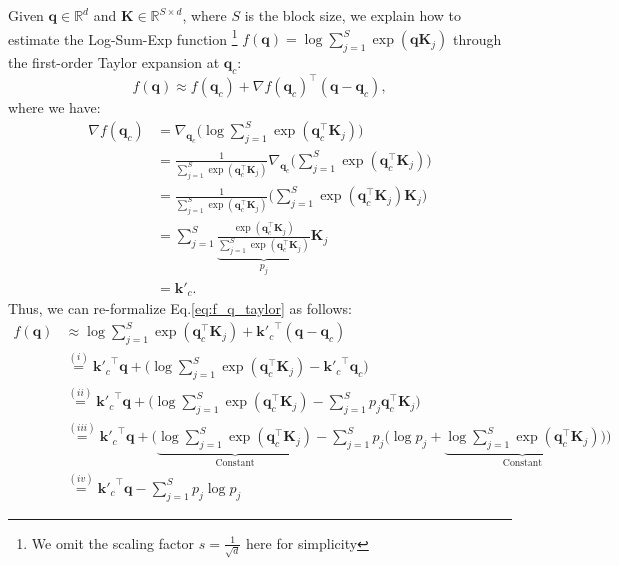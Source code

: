 Given $\boldsymbol{q} \in \mathbb{R}^{d}$ and $\mathbf{K} \in \mathbb{R}^{S\times d}$, where $S$ is the block size, we explain how to estimate the Log-Sum-Exp function \footnote{We omit the scaling factor $s=\frac{1}{\sqrt{d}}$ here for simplicity} $f(\boldsymbol{q}) = \log\sum_{j=1}^{S} \exp({\boldsymbol{q}\mathbf{K}_j})$ through the first-order Taylor expansion at $\boldsymbol{q}_c$:
\begin{equation}
f(\boldsymbol{q}) \approx f(\boldsymbol{q}_c) + \nabla f(\boldsymbol{q}_c)^{\top} (\boldsymbol{q} - \boldsymbol{q}_c),\label{eq:f_q_taylor}
\end{equation}
where we have:
\begin{align}
\nabla f(\boldsymbol{q}_c) &= \nabla_{\boldsymbol{q}_c} \Big(\log\sum_{j=1}^{S} \exp({\boldsymbol{q}_c^\top\mathbf{K}_j} )\Big) \\
&= \frac{1}{\sum_{j=1}^{S}\exp({\boldsymbol{q}_c^\top\mathbf{K}_j})}\nabla_{\boldsymbol{q}_c}\Big(\sum_{j=1}^{S} \exp({\boldsymbol{q}_c^\top\mathbf{K}_j} )\Big) \nonumber \\
&= \frac{1}{\sum_{j=1}^{S}\exp({\boldsymbol{q}_c^\top\mathbf{K}_j})}\Big(\sum_{j=1}^{S} \exp({\boldsymbol{q}_c^\top\mathbf{K}_j} )\mathbf{K}_j\Big) \nonumber\\
&= \sum_{j=1}^{S} \underbrace{\frac{\exp({\boldsymbol{q}_c^\top\mathbf{K}_j})}{\sum_{j=1}^{S}\exp({\boldsymbol{q}_c^\top\mathbf{K}_j})}}_{p_j}
\mathbf{K}_j \label{eq:nabla_fq_pj} \\
&= \boldsymbol{k}'_c.
\end{align}
Thus, we can re-formalize Eq.\ref{eq:f_q_taylor} as follows:
\begin{align}
    f(\boldsymbol{q}) &\approx \log\sum_{j=1}^{S} \exp({\boldsymbol{q}_c^\top\mathbf{K}_j} ) + {\boldsymbol{k}'_c}^{\top}(\boldsymbol{q} - \boldsymbol{q}_c) \\
    &\overset{(i)}{=} {\boldsymbol{k}'_c}^{\top}\boldsymbol{q} + \Big(\log\sum_{j=1}^{S} \exp({\boldsymbol{q}_c^\top\mathbf{K}_j} ) - {\boldsymbol{k}'_c}^\top \boldsymbol{q}_c \Big) \nonumber \\
    & \overset{(ii)}{=} {\boldsymbol{k}'_c}^{\top}\boldsymbol{q} + \Big(\log\sum_{j=1}^{S} \exp({\boldsymbol{q}_c^\top\mathbf{K}_j} ) - \sum_{j=1}^{S} p_j \boldsymbol{q}_c^\top\mathbf{K}_j\Big) \nonumber\\
    & \overset{(iii)}{=} {\boldsymbol{k}'_c}^{\top}\boldsymbol{q} + \Big(\underbrace{\log\sum_{j=1}^{S} \exp({\boldsymbol{q}_c^\top\mathbf{K}_j} )}_{\textrm{Constant}} - \sum_{j=1}^{S} p_j \big(\log p_j + \underbrace{\log\sum_{j=1}^S\exp({\boldsymbol{q}_c^\top\mathbf{K}_j})}_{\textrm{Constant}}\big)\Big) \nonumber\\
    & \overset{(iv)}{=} {\boldsymbol{k}'_c}^{\top}\boldsymbol{q}  - \sum_{j=1}^{S} p_j\log p_j 
\end{align}
